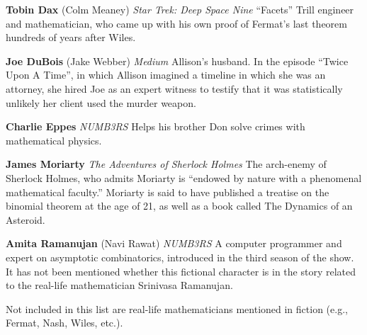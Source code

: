 \documentclass[12pt]{article}
\begin{document}

{\bf Tobin Dax} (Colm Meaney) {\it Star Trek: Deep Space Nine} ``Facets'' Trill engineer and mathematician, who came up with his own proof of Fermat's last theorem hundreds of years after Wiles.

{\bf Joe DuBois} (Jake Webber) {\it Medium} Allison's husband. In the episode ``Twice Upon A Time'', in which Allison imagined a timeline in which she was an attorney, she hired Joe as an expert witness to testify that it was statistically unlikely her client used the murder weapon.

{\bf Charlie Eppes} {\it NUMB3RS} Helps his brother Don solve crimes with mathematical physics.

{\bf James Moriarty} {\it The Adventures of Sherlock Holmes} The arch-enemy of Sherlock Holmes, who admits Moriarty is ``endowed by nature with a phenomenal mathematical faculty.''  Moriarty is said to have published a treatise on the binomial theorem at the age of 21, as well as a book called The Dynamics of an Asteroid.

{\bf {\PMlinkescapetext Amita Ramanujan}} (Navi Rawat) {\it NUMB3RS} A computer programmer and expert on asymptotic combinatorics, introduced in the third season of the show. It has not been mentioned whether this fictional character is in the story related to the real-life mathematician Srinivasa Ramanujan.

Not included in this list are real-life mathematicians mentioned in fiction (e.g., Fermat, Nash, Wiles, etc.).
\end{document}
